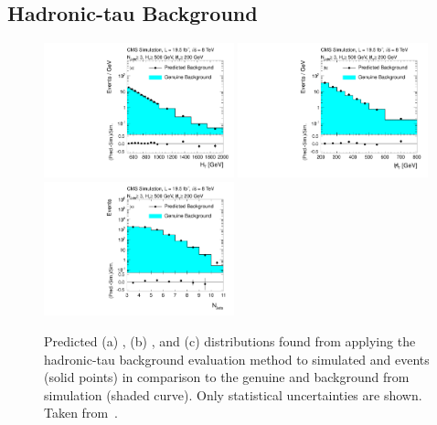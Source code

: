 \subsection{Hadronic-tau Background}
\label{subsec:RA2_tauhad}
\begin{figure}[!t]
  \centering

  \begin{minipage}[c]{1.\textwidth}
    \begin{center}
      \includegraphics[width=0.49\textwidth]{figures/RA2_TauHad1.pdf}%
      \includegraphics[width=0.49\textwidth]{figures/RA2_TauHad2.pdf}\\ 
      \includegraphics[width=0.49\textwidth]{figures/RA2_TauHad3.pdf}
    \end{center}
  \end{minipage}

  \caption{Predicted (a) \HT, (b) \MHT, and (c) \NJets distributions found from applying the hadronic-tau background evaluation method to simulated \ttbar and \WJets events (solid points) in comparison to the genuine \ttbar and \WJets background from simulation (shaded curve). Only statistical uncertainties are shown. Taken from~\cite{Chatrchyan:2014lfa}.}
  \label{fig:ra2_tauhad}
\end{figure}
